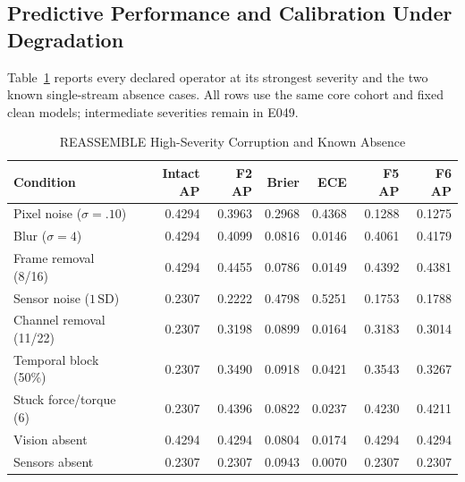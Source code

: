 \subsection{Predictive Performance and Calibration Under Degradation}

Table~\ref{tab:reassemble-corruption} reports every declared operator at its strongest
severity and the two known single-stream absence cases. All rows use the same core
cohort and fixed clean models; intermediate severities remain in E049.

\begin{table}[htbp]
\caption{REASSEMBLE High-Severity Corruption and Known Absence}
\label{tab:reassemble-corruption}
\centering\small\setlength{\tabcolsep}{3pt}
\begin{tabular}{lrrrrrr}\toprule
Condition & Intact AP & F2 AP & Brier & ECE & F5 AP & F6 AP\\\midrule
Pixel noise ($\sigma=.10$) & 0.4294 & 0.3963 & 0.2968 & 0.4368 & 0.1288 & 0.1275\\
Blur ($\sigma=4$) & 0.4294 & 0.4099 & 0.0816 & 0.0146 & 0.4061 & 0.4179\\
Frame removal (8/16) & 0.4294 & 0.4455 & 0.0786 & 0.0149 & 0.4392 & 0.4381\\
Sensor noise ($1\,\mathrm{SD}$) & 0.2307 & 0.2222 & 0.4798 & 0.5251 & 0.1753 & 0.1788\\
Channel removal (11/22) & 0.2307 & 0.3198 & 0.0899 & 0.0164 & 0.3183 & 0.3014\\
Temporal block (50\%) & 0.2307 & 0.3490 & 0.0918 & 0.0421 & 0.3543 & 0.3267\\
Stuck force/torque (6) & 0.2307 & 0.4396 & 0.0822 & 0.0237 & 0.4230 & 0.4211\\
Vision absent & 0.4294 & 0.4294 & 0.0804 & 0.0174 & 0.4294 & 0.4294\\
Sensors absent & 0.2307 & 0.2307 & 0.0943 & 0.0070 & 0.2307 & 0.2307\\
\bottomrule\end{tabular}
\end{table}

